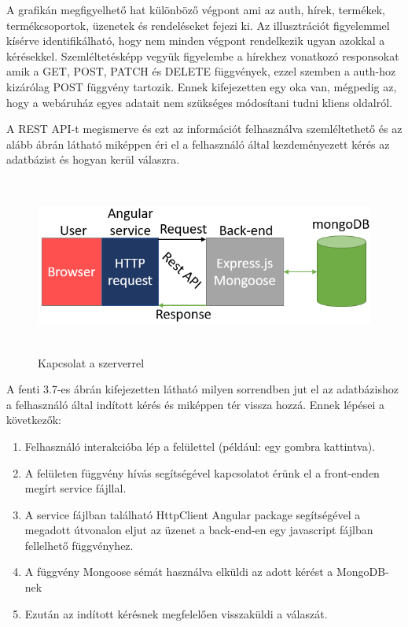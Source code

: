  A grafikán megfigyelhető hat különböző végpont ami az auth, hírek, termékek, termékcsoportok, üzenetek és rendeléseket fejezi ki. Az illusztrációt figyelemmel kísérve identifikálható, hogy nem minden végpont rendelkezik ugyan azokkal a kérésekkel. Szemléltetésképp vegyük figyelembe a hírekhez vonatkozó responsokat amik a GET, POST, PATCH és DELETE függvények, ezzel szemben a auth-hoz kizárólag POST függvény tartozik. Ennek kifejezetten egy oka van, mégpedig az, hogy a webáruház egyes adatait nem szükséges módosítani tudni kliens oldalról.

\bigskip
A REST API-t megismerve és ezt az információt felhasználva szemléltethető és az alább ábrán látható miképpen éri el a felhasználó által kezdeményezett kérés az adatbázist és hogyan kerül válaszra.

\begin{figure}[H]
	\centering
	\includegraphics[width=1.0\textwidth,height=220px]{images/kapcsolat_szerver_bemutatas.png}
	\caption{Kapcsolat a szerverrel}
	\label{fig.picture-7}
\end{figure}

A fenti 3.7-es ábrán kifejezetten látható milyen sorrendben jut el az adatbázishoz a felhasználó által indított kérés és miképpen tér vissza hozzá. Ennek lépései a következők:

\begin{enumerate}
	\item\label{step:first} Felhasználó interakcióba lép a felülettel (például: egy gombra kattintva).
	\item A felületen függvény hívás segítségével kapcsolatot érünk el a front-enden megírt service fájllal.
	\item A service fájlban található HttpClient Angular package segítségével a megadott útvonalon eljut az üzenet a back-end-en egy javascript fájlban fellelhető függvényhez.
	\item A függvény Mongoose sémát használva elküldi az adott kérést a MongoDB-nek
	\item Ezután az indított kérésnek megfelelően visszaküldi a válaszát. 
\end{enumerate}

